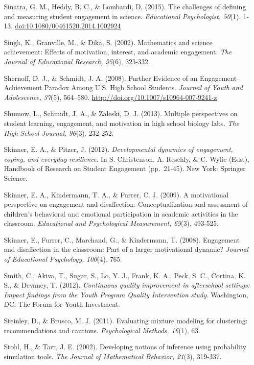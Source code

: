 \documentclass[]{book}
\theoremstyle{definition}
\theoremstyle{definition}
\theoremstyle{definition}
\theoremstyle{remark}
\begin{document}
Sinatra, G. M., Heddy, B. C., \& Lombardi, D. (2015). The challenges of
defining and measuring student engagement in science. \emph{Educational
Psychologist, 50}(1), 1-13. \url{doi:10.1080/00461520.2014.1002924}

Singh, K., Granville, M., \& Dika, S. (2002). Mathematics and science
achievement: Effects of motivation, interest, and academic engagement.
\emph{The Journal of Educational Research, 95}(6), 323-332.

Shernoff, D. J., \& Schmidt, J. A. (2008). Further Evidence of an
Engagement--Achievement Paradox Among U.S. High School Students.
\emph{Journal of Youth and Adolescence, 37}(5), 564--580.
\url{http://doi.org/10.1007/s10964-007-9241-z}

Shumow, L., Schmidt, J. A., \& Zaleski, D. J. (2013). Multiple
perspectives on student learning, engagement, and motivation in high
school biology labs. \emph{The High School Journal, 96}(3), 232-252.

Skinner, E. A., \& Pitzer, J. (2012). \emph{Developmental dynamics of
engagement, coping, and everyday resilience}. In S. Christenson, A.
Reschly, \& C. Wylie (Eds.), Handbook of Research on Student Engagement
(pp.~21-45). New York: Springer Science.

Skinner, E. A., Kindermann, T. A., \& Furrer, C. J. (2009). A
motivational perspective on engagement and disaffection:
Conceptualization and assessment of children's behavioral and emotional
participation in academic activities in the classroom. \emph{Educational
and Psychological Measurement, 69}(3), 493-525.

Skinner, E., Furrer, C., Marchand, G., \& Kindermann, T. (2008).
Engagement and disaffection in the classroom: Part of a larger
motivational dynamic? \emph{Journal of Educational Psychology, 100}(4),
765.

Smith, C., Akiva, T., Sugar, S., Lo, Y. J., Frank, K. A., Peck, S. C.,
Cortina, K. S., \& Devaney, T. (2012). \emph{Continuous quality
improvement in afterschool settings: Impact findings from the Youth
Program Quality Intervention study}. Washington, DC: The Forum for Youth
Investment.

Steinley, D., \& Brusco, M. J. (2011). Evaluating mixture modeling for
clustering: recommendations and cautions. \emph{Psychological Methods,
16}(1), 63.

Stohl, H., \& Tarr, J. E. (2002). Developing notions of inference using
probability simulation tools. \emph{The Journal of Mathematical
Behavior, 21}(3), 319-337.
\end{document}
